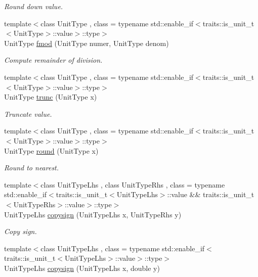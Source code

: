 \begin{DoxyCompactItemize}
\begin{DoxyCompactList}\small\item\em Round down value. \end{DoxyCompactList}\item 
{\footnotesize template$<$class Unit\+Type , class  = typename std\+::enable\+\_\+if$<$traits\+::is\+\_\+unit\+\_\+t$<$\+Unit\+Type$>$\+::value$>$\+::type$>$ }\\Unit\+Type \hyperlink{group___unit_math_ga1184575106fc9286c1f3d5f8b1754b80}{fmod} (Unit\+Type numer, Unit\+Type denom)
\begin{DoxyCompactList}\small\item\em Compute remainder of division. \end{DoxyCompactList}\item 
{\footnotesize template$<$class Unit\+Type , class  = typename std\+::enable\+\_\+if$<$traits\+::is\+\_\+unit\+\_\+t$<$\+Unit\+Type$>$\+::value$>$\+::type$>$ }\\Unit\+Type \hyperlink{group___unit_math_ga11b5f95c32479536aefd08bba4009121}{trunc} (Unit\+Type x)
\begin{DoxyCompactList}\small\item\em Truncate value. \end{DoxyCompactList}\item 
{\footnotesize template$<$class Unit\+Type , class  = typename std\+::enable\+\_\+if$<$traits\+::is\+\_\+unit\+\_\+t$<$\+Unit\+Type$>$\+::value$>$\+::type$>$ }\\Unit\+Type \hyperlink{group___unit_math_ga24ed7e40e8b06b4d6b9d5e990844adde}{round} (Unit\+Type x)
\begin{DoxyCompactList}\small\item\em Round to nearest. \end{DoxyCompactList}\item 
{\footnotesize template$<$class Unit\+Type\+Lhs , class Unit\+Type\+Rhs , class  = typename std\+::enable\+\_\+if$<$traits\+::is\+\_\+unit\+\_\+t$<$\+Unit\+Type\+Lhs$>$\+::value \&\& traits\+::is\+\_\+unit\+\_\+t$<$\+Unit\+Type\+Rhs$>$\+::value$>$\+::type$>$ }\\Unit\+Type\+Lhs \hyperlink{group___unit_math_ga1006f33c11405e5cbc5a103d41df07a0}{copysign} (Unit\+Type\+Lhs x, Unit\+Type\+Rhs y)
\begin{DoxyCompactList}\small\item\em Copy sign. \end{DoxyCompactList}\item 
\hypertarget{namespaceunits_1_1math_aa1a36017e6e427ba1453717f1dd3558a}{}{\footnotesize template$<$class Unit\+Type\+Lhs , class  = typename std\+::enable\+\_\+if$<$traits\+::is\+\_\+unit\+\_\+t$<$\+Unit\+Type\+Lhs$>$\+::value$>$\+::type$>$ }\\Unit\+Type\+Lhs \hyperlink{namespaceunits_1_1math_aa1a36017e6e427ba1453717f1dd3558a}{copysign} (Unit\+Type\+Lhs x, double y)\label{namespaceunits_1_1math_aa1a36017e6e427ba1453717f1dd3558a}


\end{DoxyCompactItemize}
